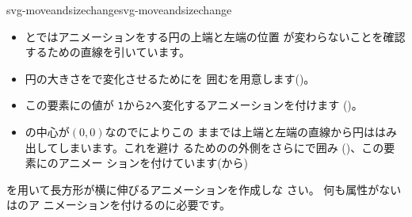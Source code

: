 {svg-moveandsizechange}{svg-moveandsizechange}
\begin{itemize}
 \item {}とではアニメーションをする円の上端と左端の位置
       が変わらないことを確認するための直線を引いています。
 \item 円の大きさをで変化させるためにを
       囲むを用意します()。
 \item この要素にの値が
       \texttt{1}から\texttt{2}へ変化するアニメーションを付けます
       ()。
 \item {}の中心が$(0,0)$なのでによりこの
       ままでは上端と左端の直線から円ははみ出してしまいます。これを避け
       るためのの外側をさらにで囲み
       ()、この要素にのアニメー
       ションを付けています(から)
\end{itemize}
{を用いて長方形が横に伸びるアニメーションを作成しな
 さい。}
{何も属性がない\noexpand{}は\noexpand{}のア
ニメーションを付けるのに必要です。}
